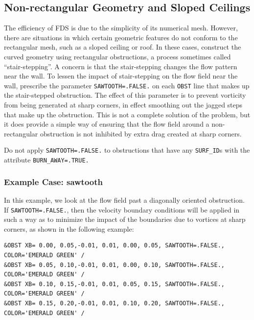 \documentclass[11pt]{book}
\newcommand{\ct}{\tt\small}
\begin{document}
\subsection{Non-rectangular Geometry and Sloped Ceilings}
\label{info:SAWTOOTH}

The efficiency of FDS is due to the simplicity of its numerical mesh.
However, there are situations in which certain geometric features do
not conform to the rectangular mesh, such as a sloped ceiling or roof. In these cases,
construct the curved geometry using rectangular obstructions, a process
sometimes called ``stair-stepping''. A concern is that
the stair-stepping changes the flow pattern near the wall. To lessen
the impact of stair-stepping on the flow field near the wall,
prescribe the parameter {\ct SAWTOOTH=.FALSE.}
on each {\ct OBST} line that makes up the stair-stepped obstruction.
The effect of this parameter is to prevent vorticity from being generated
at sharp corners, in effect smoothing out the jagged steps that make up
the obstruction. This is not a complete solution of the problem, but it
does provide a simple way of ensuring that the flow field around a
non-rectangular obstruction is not inhibited by extra drag created at
sharp corners.

\begin{warning}
Do not apply {\ct SAWTOOTH=.FALSE.} to obstructions that have any {\ct SURF\_ID}s with the
attribute {\ct BURN\_AWAY=.TRUE.}
\end{warning}

\subsubsection{Example Case: {\bf sawtooth}}

In this example, we look at the flow field past a diagonally oriented obstruction. If {\ct SAWTOOTH=.FALSE.}, then the velocity boundary conditions will be applied in
such a way as to minimize the impact of the boundaries due to vortices at sharp corners, as shown in the following example:

\scriptsize
\begin{verbatim}
&OBST XB= 0.00, 0.05,-0.01, 0.01, 0.00, 0.05, SAWTOOTH=.FALSE., COLOR='EMERALD GREEN' /
&OBST XB= 0.05, 0.10,-0.01, 0.01, 0.00, 0.10, SAWTOOTH=.FALSE., COLOR='EMERALD GREEN' /
&OBST XB= 0.10, 0.15,-0.01, 0.01, 0.05, 0.15, SAWTOOTH=.FALSE., COLOR='EMERALD GREEN' /
&OBST XB= 0.15, 0.20,-0.01, 0.01, 0.10, 0.20, SAWTOOTH=.FALSE., COLOR='EMERALD GREEN' /
\end{verbatim}\normalsize
\end{document}
